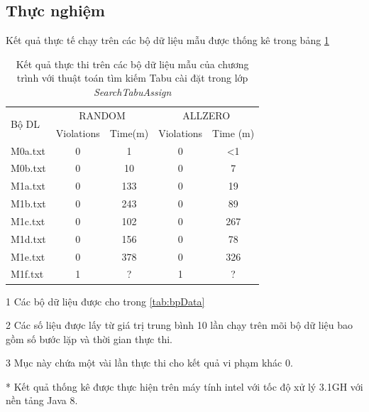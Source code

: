 \subsection{Thực nghiệm}
Kết quả thực tế chạy trên các bộ dữ liệu mẫu được thống kê trong bảng \ref{tab:res}
{\scriptsize
\begin{table}[H]
	\centering
	\begin{threeparttable}
		\begin{tabular}{| l | c | c | c | c |}
			\hline
			\hline
			\multirow{ 2}{*}{Bộ DL\tnote{1}}
										& \multicolumn{2}{c}{RANDOM\tnote{2}} & \multicolumn{2}{c}{ALLZERO\tnote{2}} \\
			\cline{2-5}
										&Violations 		& Time(m)				& Violations		& Time (m)	\\
			\hline
			\hline

			M0a.txt 				 	&	0				&	1					& 	0			&	<1\\
			\hline
			M0b.txt 				 	&	0				&	10					& 	0			&	7\\
			\hline
			M1a.txt 				 	&	0				&	133					& 	0			&	19\\ 
			\hline
			M1b.txt 				 	&	0				&	243					& 	0			&	89\\ 
			\hline
			M1c.txt 					&	0				&	102					& 	0			&	267\\  
			\hline
			M1d.txt 					&	0				&	156					& 	0			&	78\\  
			\hline
			M1e.txt 					&	0\tnote{3}		&	378	    			& 	0\tnote{3}	&	326\\  
			\hline
			M1f.txt 					&	1				&	?					& 	1			&	?\\  
			\hline
			\hline
		\end{tabular}
		\begin{tablenotes}
			\item[1] Các bộ dữ liệu được cho trong \ref{tab:bpData}
			\item[2] Các số liệu được lấy từ giá trị trung bình 10 lần chạy trên mõi bộ dữ liệu bao gồm số bước lặp và thời gian thực thi.
			\item[3] Mục này chứa một vài lần thực thi cho kết quả vi phạm khác 0.
			\item[*] Kết quả thống kê được thực hiện trên máy tính intel với tốc độ xử lý 3.1GH với nền tảng Java 8.
		\end{tablenotes}
	\end{threeparttable}
    \caption{Kết quả thực thi trên các bộ dữ liệu mẫu của chương trình với thuật toán tìm kiếm Tabu cài đặt trong lớp \textsl{SearchTabuAssign} \label{tab:res}}

\end{table}
}

